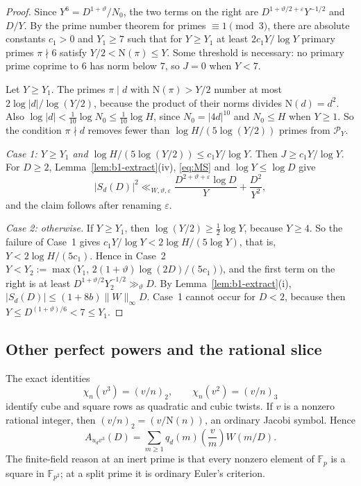 \documentclass[11pt]{article}
\numberwithin{equation}{section}
\newcommand{\N}{\mathrm N}
\begin{document}
\begin{proof}
Since $Y^6=D^{1+\vartheta}/N_0$, the two terms on the right are $D^{1+\vartheta/2+\varepsilon}Y^{-1/2}$ and $D/Y$. By the
prime number theorem for primes $\equiv1\pmod 3$, there are absolute constants $c_1>0$ and $Y_1\ge7$ such that for
$Y\ge Y_1$ at least $2c_1Y/\log Y$ primary primes $\pi\nmid6$ satisfy $Y/2<\N(\pi)\le Y$. Some threshold is
necessary: no primary prime coprime to $6$ has norm below $7$, so $J=0$ when $Y<7$.

Let $Y\ge Y_1$. The primes $\pi\mid d$ with $\N(\pi)>Y/2$ number at most $2\log|d|/\log(Y/2)$, because the product
of their norms divides $\N(d)=d^2$. Also $\log|d|<\frac1{10}\log N_0\le\frac1{10}\log H$, since $N_0=|4d|^{10}$ and
$N_0\le H$ when $Y\ge1$. So the condition $\pi\nmid d$ removes fewer than $\log H/(5\log(Y/2))$ primes from
$\mathcal P_Y$.

\emph{Case 1: $Y\ge Y_1$ and $\log H/(5\log(Y/2))\le c_1Y/\log Y$.} Then $J\ge c_1Y/\log Y$. For $D\ge2$,
Lemma~\ref{lem:b1-extract}(iv), \eqref{eq:MS} and $\log Y\le\log D$ give
\begin{equation}\label{eq:d026}
 |S_d(D)|^2\ll_{W,\vartheta,\varepsilon}\frac{D^{2+\vartheta+\varepsilon}\log D}Y+\frac{D^2}{Y^2},
\end{equation}
and the claim follows after renaming $\varepsilon$.

\emph{Case 2: otherwise.} If $Y\ge Y_1$, then $\log(Y/2)\ge\frac12\log Y$, because $Y\ge4$. So the failure of Case~1
gives $c_1Y/\log Y<2\log H/(5\log Y)$, that is, $Y<2\log H/(5c_1)$. Hence in Case~2
$Y<Y_2:=\max\bigl(Y_1,\,2(1+\vartheta)\log(2D)/(5c_1)\bigr)$, and the first term on the right is at least
$D^{1+\vartheta/2}Y_2^{-1/2}\gg_\vartheta D$. By Lemma~\ref{lem:b1-extract}(i), $|S_d(D)|\le(1+8b)\|W\|_\infty D$.
Case~1 cannot occur for $D<2$, because then $Y\le D^{(1+\vartheta)/6}<7\le Y_1$.
\end{proof}

\subsection{Other perfect powers and the rational slice}
The exact identities
\begin{equation}\label{eq:d027}
 \chi_n(v^3)=(v/n)_2,\qquad \chi_n(v^2)=(v/n)_3
\end{equation}
identify cube and square rows as quadratic and cubic twists.
If $v$ is a nonzero rational integer, then
$(v/n)_2=(v/\N(n))$, an ordinary Jacobi symbol. Hence
\begin{equation}\label{eq:quadratic-twists}
 A_{u_dv^3}(D)=\sum_{m\ge1}q_d(m)
                       \left(\frac vm\right)W(m/D).
\end{equation}
The finite-field reason at an inert prime is that every nonzero element
of $\mathbb F_p$ is a square in $\mathbb F_{p^2}$; at a split prime it
is ordinary Euler's criterion.
\end{document}
